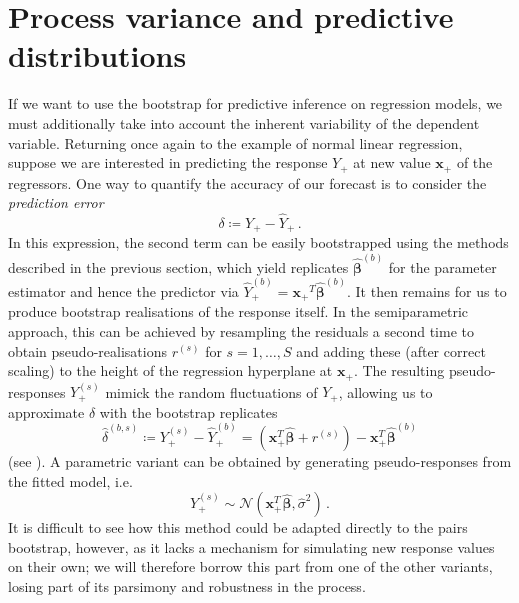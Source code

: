 \documentclass[a4paper]{book}
\begin{document}
\section{Process variance and predictive distributions} \label{sec:boot-proc}

If we want to use the bootstrap for predictive inference on regression models, we must additionally take into account the inherent variability of the dependent variable. Returning once again to the example of normal linear regression, suppose we are interested in predicting the response $Y_+$ at new value $\mathbf{x_+}$ of the regressors. One way to quantify the accuracy of our forecast is to consider the \emph{prediction error}
\begin{equation}
  \delta \coloneqq Y_+ - \widehat{Y}_+ \,.
\end{equation}
In this expression, the second term can be easily bootstrapped using the methods described in the previous section, which yield replicates $\widehat{\bm{\beta}}^{(b)}$ for the parameter estimator and hence the predictor via $\widehat{Y}^{(b)}_+ = \mathbf{x_+}^T \widehat{\bm{\beta}}^{(b)}$. It then remains for us to produce bootstrap realisations of the response itself. In the semiparametric approach, this can be achieved by resampling the residuals a second time to obtain pseudo-realisations $r^{(s)}$ for $s = 1, \dots, S$ and adding these (after correct scaling) to the height of the regression hyperplane at $\mathbf{x_+}$. The resulting pseudo-responses $Y^{(s)}_+$ mimick the random fluctuations of $Y_+$, allowing us to approximate $\delta$ with the bootstrap replicates
\begin{equation} \label{eq:pred-error-boot}
  \widehat{\delta}^{(b, s)} \coloneqq Y^{(s)}_+ - \widehat{Y}^{(b)}_+ = (\mathbf{x}^T_+ \widehat{\bm{\beta}} + r^{(s)}) - \mathbf{x}^T_+ \widehat{\bm{\beta}}^{(b)}
\end{equation}
(see \cite[Algorithm 6.4]{davison}). A parametric variant can be obtained by generating pseudo-responses from the fitted model, i.e.\
\begin{equation}
  Y^{(s)}_+ \sim \mathcal{N}(\mathbf{x}^T_+ \widehat{\bm{\beta}}, \widehat{\sigma}^2) \,.
\end{equation}
It is difficult to see how this method could be adapted directly to the pairs bootstrap, however, as it lacks a mechanism for simulating new response values on their own; we will therefore borrow this part from one of the other variants, losing part of its parsimony and robustness in the process. 
\end{document}
